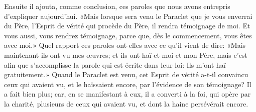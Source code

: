 Ensuite il ajouta, comme conclusion,
	ces paroles que nous avons entrepris d’expliquer aujourd’hui.
«Mais lorsque sera venu le Paraclet que je vous enverrai du Père,
	l’Esprit de vérité qui procède du Père,
	il rendra témoignage de moi.
Et vous aussi, vous rendrez témoignage,
	parce que, dès le commencement, vous êtes avec moi.»
Quel rapport ces paroles ont-elles avec ce qu’il vient de dire:
	«Mais maintenant ils ont vu mes œuvres;
	et ils ont haï et moi et mon Père,
	mais c’est afin que s’accomplisse la parole qui est écrite dans leur loi:
	Ils m’ont haï gratuitement.»
Quand le Paraclet est venu,
	cet Esprit de vérité a-t-il convaincu ceux qui avaient vu,
		et le haïssaient encore,
	par l’évidence de son témoignage?
Il a fait bien plus; car, en se manifestant à eux,
	il a converti à la foi, qui opère par la charité,
	plusieurs de ceux qui avaient vu, et dont la haine persévérait encore.
